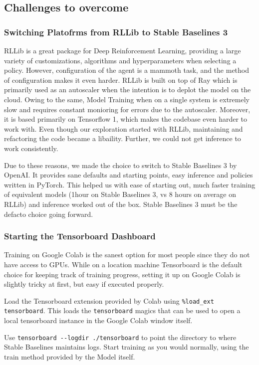 \documentclass{article}
\begin{document}
\subsection{Challenges to overcome}

\subsubsection{Switching Platofrms from RLLib to Stable Baselines 3}
RLLib is a great package for Deep Reinforcement Learning, providing a large variety of customizations, algorithms and hyperparameters when selecting a policy. However, configuration of the agent is a mammoth task, and the method of configuration makes it even harder. RLLib is built on top of Ray which is primarily used as an autoscaler when the intention is to deplot the model on the cloud. Owing to the same, Model Training when on a single system is extremely slow and requires constant monioring for errors due to the autoscaler. Moreover, it is based primarily on Tensorflow 1, which makes the codebase even harder to work with. Even though our exploration started with RLLib, maintaining and refactoring the code became a libaility. Further, we could not get inference to work consistently.

Due to these reasons, we made the choice to switch to Stable Baselines 3 by OpenAI. It provides sane defaults and starting points, easy inference and policies written in PyTorch. This helped us with ease of starting out, much faster training of equivalent models (1hour on Stable Baselines 3, vs 8 hours on average on RLLib) and inference worked out of the box. Stable Baselines 3 must be the defacto choice going forward.


\subsubsection{Starting the Tensorboard Dashboard}
Training on Google Colab is the sanest option for most people since they do not have access to GPUs. While on a location machine Tensorboard is the default choice for keeping track of training progress, setting it up on Google Colab is slightly tricky at first, but easy if executed properly.

Load the Tensorboard extension provided by Colab using \lstinline{%load_ext tensorboard}. This loads the \lstinline{tensorboard} magics that can be used to open a local tensorboard instance in the Google Colab window itself.

Use \lstinline{tensorboard --logdir ./tensorboard} to point the directory to where Stable Baselines maintains logs. Start training as you would normally, using the train method provided by the Model itself.
\end{document}
